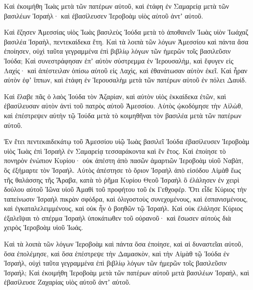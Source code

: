 {Καὶ ἐκοιμήθη Ἰωὰς μετὰ τῶν πατέρων αὐτοῦ, καὶ ἐτάφη ἐν Σαμαρείᾳ μετὰ τῶν βασιλέων Ἰσραήλ· καὶ ἐβασίλευσεν Ἰεροβοὰμ υἱὸς αὐτοῦ ἀντʼ αὐτοῦ.
\par }{\PP {}Καὶ ἔζησεν Ἀμεσσίας υἱὸς Ἰωὰς βασιλεὺς Ἰούδα μετὰ τὸ ἀποθανεῖν Ἰωὰς υἱὸν Ἰωάχαζ βασιλέα Ἰσραὴλ, πεντεκαίδεκα ἔτη.
Καὶ τὰ λοιπὰ τῶν λόγων Ἀμεσσίου καὶ πάντα ἅσα ἐποίησεν, οὐχὶ ταῦτα γεγραμμένα ἐπὶ βιβλίῳ λόγων τῶν ἡμερῶν τοῖς βασιλεῦσιν Ἰούδα;
Καὶ συνεστράφησαν ἐπʼ αὐτὸν σύστρεμμα ἐν Ἱερουσαλὴμ, καὶ ἔφυγεν εἰς Λαχίς· καὶ ἀπέστειλαν ὀπίσω αὐτοῦ εἰς Λαχὶς, καὶ ἐθανάτωσαν αὐτὸν ἐκεῖ.
Καὶ ἦραν αὐτὸν ἐφʼ ἵππων, καὶ ἐτάφη ἐν Ἱερουσαλὴμ μετὰ τῶν πατέρων αὐτοῦ ἐν πόλει Δαυίδ.
\par }{\PP {}Καὶ ἔλαβε πᾶς ὁ λαὸς Ἰούδα τὸν Ἀζαρίαν, καὶ αὐτὸν υἱὸς ἑκκαίδεκα ἐτῶν, καὶ ἐβασίλευσαν αὐτὸν ἀντὶ τοῦ πατρὸς αὐτοῦ Ἀμεσσίου.
Αὐτὸς ᾠκοδόμησε τὴν Αἰλὼθ, καὶ ἐπέστρεψεν αὐτὴν τῷ Ἰούδα μετὰ τὸ κοιμηθῆναι τὸν βασιλέα μετὰ τῶν πατέρων αὐτοῦ.
\par }{\PP {}Ἐν ἔτει πεντεκαιδεκάτῳ τοῦ Ἀμεσσίου υἱῷ Ἰωὰς βασιλεῖ Ἰούδα ἐβασίλευσεν Ἱεροβοὰμ υἱὸς Ἰωὰς ἐπὶ Ἰσραὴλ ἐν Σαμαρείᾳ τεσσαράκοντα καὶ ἓν ἔτος.
Καὶ ἐποίησε τὸ πονηρὸν ἐνώπιον Κυρίου· οὐκ ἀπέστη ἀπὸ πασῶν ἁμαρτιῶν Ἰεροβοὰμ υἱοῦ Ναβὰτ, ὃς ἐξήμαρτε τὸν Ἰσραήλ.
Αὐτὸς ἀπέστησε τὸ ὅριον Ἰσραὴλ ἀπὸ εἰσόδου Αἰμὰθ ἕως τῆς θαλάσσης τῆς Ἄραβα, κατὰ τὸ ῥῆμα Κυρίου Θεοῦ Ἰσραὴλ ὃ ἐλάλησεν ἐν χειρὶ δούλου αὐτοῦ Ἰῶνα υἱοῦ Ἀμαθὶ τοῦ προφήτου τοῦ ἐκ Γεθχοφέρ.
Ὅτι εἶδε Κύριος τὴν ταπείνωσιν Ἰσραὴλ πικρὰν σφόδρα, καὶ ὀλιγοστοὺς συνεχομένους, καὶ ἐσπανισμένους, καὶ ἐγκαταλελειμμένους, καὶ οὐκ ἦν ὁ βοηθῶν τῷ Ἰσραήλ.
Καὶ οὐκ ἐλάλησε Κύριος ἐξαλεῖψαι τὸ σπέρμα Ἰσραὴλ ὑποκάτωθεν τοῦ οὐρανοῦ· καὶ ἔσωσεν αὐτοὺς διὰ χειρὸς Ἱεροβοὰμ υἱοῦ Ἰωάς.
\par }{\PP {}Καὶ τὰ λοιπὰ τῶν λόγων Ἱεροβοὰμ καὶ πάντα ὅσα ἐποίησε, καὶ αἱ δυναστεῖαι αὐτοῦ, ὅσα ἐπολέμησε, καὶ ὅσα ἐπέστρεψε τὴν Δαμασκὸν, καὶ τὴν Αἰμὰθ τῷ Ἰούδα ἐν Ἰσραὴλ, οὐχὶ ταῦτα γεγραμμένα ἐπὶ βιβλίῳ λόγων τῶν ἡμερῶν τοῖς βασιλεῦσιν Ἰσραήλ;
Καὶ ἐκοιμήθη Ἱεροβοὰμ μετὰ τῶν πατέρων αὐτοῦ μετὰ βασιλέων Ἰσραὴλ, καὶ ἐβασίλευσε Ζαχαρίας υἱὸς αὐτοῦ ἀντʼ αὐτοῦ.

}
